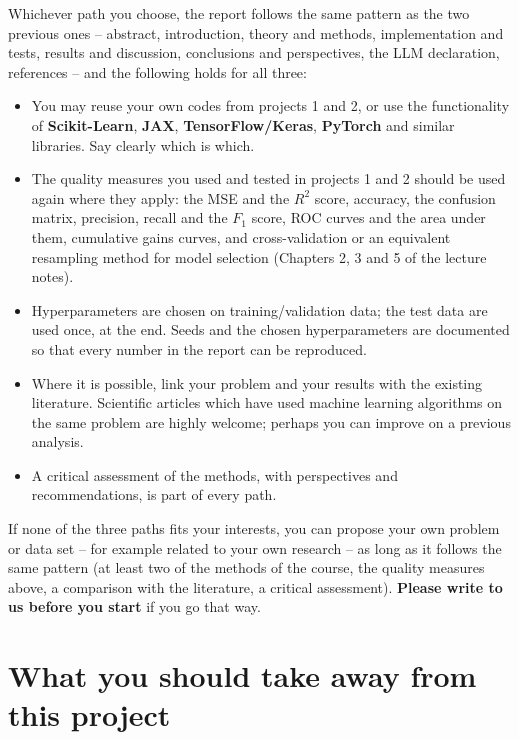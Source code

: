 \documentclass[11pt,a4paper]{article}
\begin{document}
Whichever path you choose, the report follows the same pattern as the two
previous ones -- abstract, introduction, theory and methods, implementation
and tests, results and discussion, conclusions and perspectives, the LLM
declaration, references -- and the following holds for all three:
\begin{itemize}[nosep]
  \item You may reuse your own codes from projects 1 and 2, or use the
        functionality of \textbf{Scikit-Learn}, \textbf{JAX},
        \textbf{TensorFlow/Keras}, \textbf{PyTorch} and similar libraries.
        Say clearly which is which.
  \item The quality measures you used and tested in projects 1 and 2 should
        be used again where they apply: the MSE and the $R^2$ score,
        accuracy, the confusion matrix, precision, recall and the $F_1$ score,
        ROC curves and the area under them, cumulative gains curves, and
        cross-validation or an equivalent resampling method for model
        selection (Chapters 2, 3 and 5 of the lecture notes).
  \item Hyperparameters are chosen on training/validation data; the test
        data are used once, at the end.  Seeds and the chosen hyperparameters
        are documented so that every number in the report can be reproduced.
  \item Where it is possible, link your problem and your results with the
        existing literature.  Scientific articles which have used machine
        learning algorithms on the same problem are highly welcome; perhaps
        you can improve on a previous analysis.
  \item A critical assessment of the methods, with perspectives and
        recommendations, is part of every path.
\end{itemize}

If none of the three paths fits your interests, you can propose your own
problem or data set -- for example related to your own research -- as long
as it follows the same pattern (at least two of the methods of the course,
the quality measures above, a comparison with the literature, a critical
assessment).  \textbf{Please write to us before you start} if you go that way.

\section*{What you should take away from this project}
\end{document}
